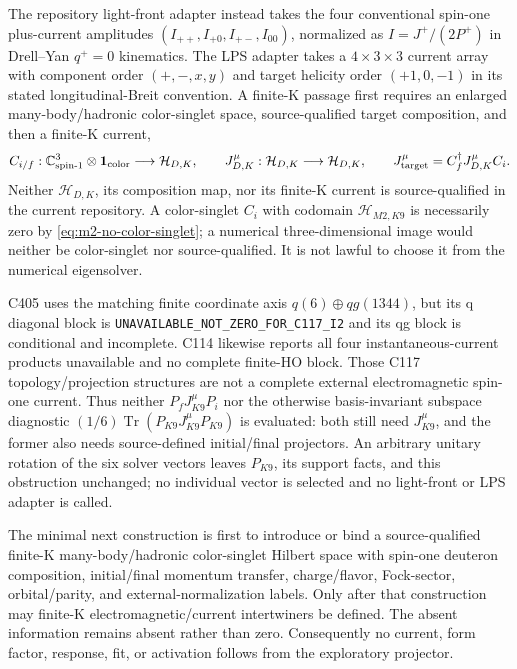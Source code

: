 \documentclass[11pt,oneside]{book}
\begin{document}
The repository light-front adapter instead takes the four conventional
spin-one plus-current amplitudes $(I_{++},I_{+0},I_{+-},I_{00})$, normalized
as $I=J^+/(2P^+)$ in Drell--Yan $q^+=0$ kinematics. The LPS adapter takes a
$4\times3\times3$ current array with component order $(+,-,x,y)$ and target
helicity order $(+1,0,-1)$ in its stated longitudinal-Breit convention. A
finite-K passage first requires an enlarged many-body/hadronic color-singlet
space, source-qualified target composition, and then a finite-K current,
\begin{equation}
 C_{i/f}:\mathbb C^3_{\rm spin\text{-}1}\otimes\mathbf1_{\rm color}
 \longrightarrow\mathcal H_{D,K},
 \qquad J_{D,K}^\mu:\mathcal H_{D,K}\longrightarrow\mathcal H_{D,K},
 \qquad J_{\rm target}^\mu=C_f^\dagger J_{D,K}^\mu C_i.
 \label{eq:m2-target-current-map}
\end{equation}
Neither $\mathcal H_{D,K}$, its composition map, nor its finite-K current is
source-qualified in the current repository. A color-singlet $C_i$ with
codomain $\mathcal H_{M2,K9}$ is necessarily zero by
\cref{eq:m2-no-color-singlet}; a numerical three-dimensional image would
neither be color-singlet nor source-qualified. It is not lawful to choose it
from the numerical eigensolver.

C405 uses the matching finite coordinate axis $q(6)\oplus qg(1344)$, but its
q diagonal block is \texttt{UNAVAILABLE\_NOT\_ZERO\_FOR\_C117\_I2} and its
qg block is conditional and incomplete. C114 likewise reports all four
instantaneous-current products unavailable and no complete finite-HO block.
Those C117 topology/projection structures are not a complete external
electromagnetic spin-one current. Thus neither
$P_fJ_{K9}^\mu P_i$ nor the otherwise basis-invariant subspace diagnostic
$(1/6)\operatorname{Tr}(P_{K9}J_{K9}^\mu P_{K9})$ is evaluated: both still
need $J_{K9}^\mu$, and the former also needs source-defined initial/final
projectors. An arbitrary unitary rotation of the six solver vectors leaves
$P_{K9}$, its support facts, and this obstruction unchanged; no individual
vector is selected and no light-front or LPS adapter is called.

The minimal next construction is first to introduce or bind a
source-qualified finite-K many-body/hadronic color-singlet Hilbert space with
spin-one deuteron composition, initial/final momentum transfer, charge/flavor,
Fock-sector, orbital/parity, and external-normalization labels. Only after
that construction may finite-K electromagnetic/current intertwiners be
defined. The absent information remains absent rather than zero. Consequently
no current, form factor, response, fit, or activation follows from the
exploratory projector.
\end{document}
